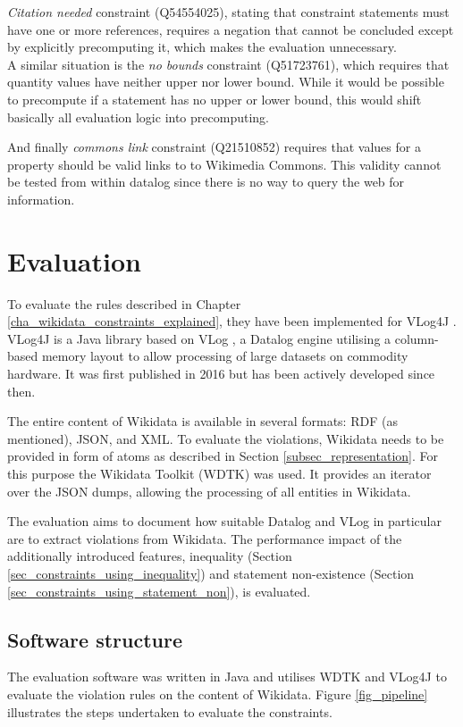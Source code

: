 \documentclass[hyperref,bachelorofscience,fleqn]{cgvpub}
\begin{document}
\emph{Citation needed} constraint (Q54554025), stating that constraint statements must have one or more references, requires a negation that cannot be concluded except by explicitly precomputing it, which makes the evaluation unnecessary. \\
A similar situation is the \emph{no bounds} constraint (Q51723761), which requires that quantity values have neither upper nor lower bound. While it would be possible to precompute if a statement has no upper or lower bound, this would shift basically all evaluation logic into precomputing.

And finally \emph{commons link} constraint (Q21510852) requires that values for a property should be valid links to to Wikimedia Commons. This validity cannot be tested from within datalog since there is no way to query the web for information.

\chapter{Evaluation}\label{cha_evaluation}

To evaluate the rules described in Chapter \ref{cha_wikidata_constraints_explained}, they have been implemented for VLog4J \cite{vlog4j}. VLog4J is a Java library based on VLog \cite{vlog}, a Datalog engine utilising a column-based memory layout to allow processing of large datasets on commodity hardware. It was first published in 2016\cite{UJK2016} but has been actively developed since then.

The entire content of Wikidata is available in several formats: RDF (as mentioned), JSON, and XML. To evaluate the violations, Wikidata needs to be provided in form of atoms as described in 
Section \ref{subsec_representation}. For this purpose the Wikidata Toolkit (WDTK)\cite{wdtk} was used. It provides an iterator over the JSON dumps, allowing the processing of all entities in Wikidata.

The evaluation aims to document how suitable Datalog and VLog in particular are to extract violations from Wikidata. The performance impact of the additionally introduced features, inequality (Section \ref{sec_constraints_using_inequality}) and statement non-existence (Section \ref{sec_constraints_using_statement_non}), is evaluated.

\section{Software structure}
The evaluation software\cite{wcd} was written in Java and utilises WDTK and VLog4J to evaluate the violation rules on the content of Wikidata. Figure \ref{fig_pipeline} illustrates the steps undertaken to evaluate the constraints.
\end{document}

